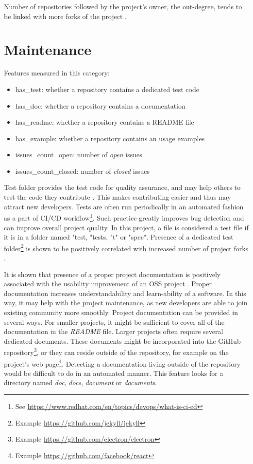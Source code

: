 Number of repositories followed by the project's owner, the out-degree, tends to be linked with more forks of the project \cite{p:10}.

\section{Maintenance}
\label{sec:maintenance}

Features measured in this category:

\begin{itemize}
    \item has\_test: whether a repository contains a dedicated test code
    \item has\_doc: whether a repository contains a documentation
    \item has\_readme: whether a repository contains a README file
    \item has\_example: whether a repository contains an usage examples
    \item issues\_count\_open: number of \emph{open} issues
    \item issues\_count\_closed: number of \emph{closed} issues
\end{itemize}

Test folder provides the test code for quality assurance, and may help others to test the code they contribute \cite{p:4}.
This makes contributing easier and thus may attract new developers.
Tests are often run periodically in an automated fashion as a part of CI/CD workflow\footnote{See \url{https://www.redhat.com/en/topics/devops/what-is-ci-cd}}.
Such practice greatly improves bug detection and can improve overall project quality.
In this project, a file is considered a test file if it is in a folder named "test, "tests, "t" or "spec".
Presence of a dedicated test folder\footnote{Example \url{https://github.com/jekyll/jekyll}} is shown to be positively correlated with increased number of project forks \cite{p:4}.

It is shown that presence of a proper project documentation is positively associated with the usability improvement of an OSS project \cite{documentation}.
Proper documentation increases understandability and learn-ability of a software.
In this way, it may help with the project maintenance, as new developers are able to join existing community more smoothly.
Project documentation can be provided in several ways.
For smaller projects, it might be sufficient to cover all of the documentation in the \emph{README} file.
Larger projects often require several dedicated documents.
These documents might be incorporated into the GitHub repository\footnote{Example \url{https://github.com/electron/electron}}, or they can reside outside of the repository, for example on the project's web page\footnote{Example \url{https://github.com/facebook/react}}.
Detecting a documentation living outside of the repository would be difficult to do in an automated manner.
This feature looks for a directory named \emph{doc}, \emph{docs}, \emph{document} or \emph{documents}.

